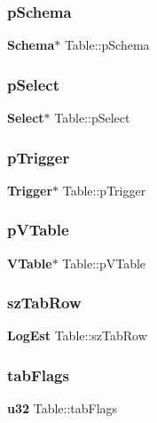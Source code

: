 \mbox{\label{struct_table_a1d6ce038a061722cebaeba0f3ffceacf}} 
\subsubsection{pSchema}
{\footnotesize\ttfamily \textbf{ Schema}$\ast$ Table\+::p\+Schema}

\mbox{\label{struct_table_a39d620182fe2174fc97d04094421fa60}} 
\subsubsection{pSelect}
{\footnotesize\ttfamily \textbf{ Select}$\ast$ Table\+::p\+Select}

\mbox{\label{struct_table_aca61c40bb0164f2c6fc3406c28988660}} 
\subsubsection{pTrigger}
{\footnotesize\ttfamily \textbf{ Trigger}$\ast$ Table\+::p\+Trigger}

\mbox{\label{struct_table_a7b9903cfbfefe7b8bf872c4f50cb2e95}} 
\subsubsection{pVTable}
{\footnotesize\ttfamily \textbf{ V\+Table}$\ast$ Table\+::p\+V\+Table}

\mbox{\label{struct_table_a141c547347c585b17f9ca2664967ab75}} 
\subsubsection{szTabRow}
{\footnotesize\ttfamily \textbf{ Log\+Est} Table\+::sz\+Tab\+Row}

\mbox{\label{struct_table_ad5bb11ce3d3751eb53a72f3bcdb3efef}} 
\subsubsection{tabFlags}
{\footnotesize\ttfamily \textbf{ u32} Table\+::tab\+Flags}

